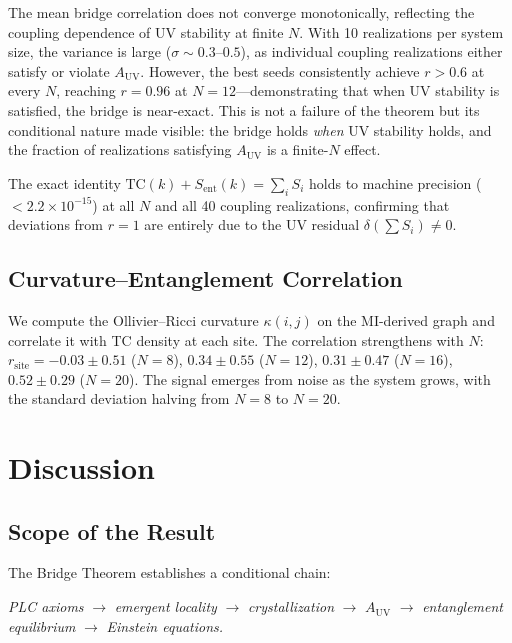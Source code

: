 \documentclass[aps,pra,twocolumn,superscriptaddress,floatfix]{revtex4-2}
\begin{document}
The mean bridge correlation does not converge monotonically, reflecting the coupling dependence of UV stability at finite $N$.
With 10 realizations per system size, the variance is large ($\sigma \sim 0.3$--$0.5$), as individual coupling realizations either satisfy or violate $A_{\mathrm{UV}}$.
However, the best seeds consistently achieve $r > 0.6$ at every $N$, reaching $r = 0.96$ at $N = 12$---demonstrating that when UV stability is satisfied, the bridge is near-exact.
This is not a failure of the theorem but its conditional nature made visible: the bridge holds \emph{when} UV stability holds, and the fraction of realizations satisfying $A_{\mathrm{UV}}$ is a finite-$N$ effect.

The exact identity $\mathrm{TC}(k) + S_{\mathrm{ent}}(k) = \sum_i S_i$ holds to machine precision ($< 2.2 \times 10^{-15}$) at all $N$ and all 40 coupling realizations, confirming that deviations from $r = 1$ are entirely due to the UV residual $\delta(\sum S_i) \neq 0$.

\subsection{Curvature--Entanglement Correlation}

We compute the Ollivier--Ricci curvature $\kappa(i,j)$ on the MI-derived graph and correlate it with TC density at each site.
The correlation strengthens with $N$: $r_{\mathrm{site}} = -0.03 \pm 0.51$ ($N\!=\!8$), $0.34 \pm 0.55$ ($N\!=\!12$), $0.31 \pm 0.47$ ($N\!=\!16$), $0.52 \pm 0.29$ ($N\!=\!20$).
The signal emerges from noise as the system grows, with the standard deviation halving from $N = 8$ to $N = 20$.


\section{Discussion}
\label{sec:discussion}

\subsection{Scope of the Result}

The Bridge Theorem establishes a conditional chain:

\medskip
\noindent
\emph{PLC axioms} $\to$ \emph{emergent locality} $\to$ \emph{crystallization} $\to$ \emph{$A_{\mathrm{UV}}$} $\to$ \emph{entanglement equilibrium} $\to$ \emph{Einstein equations.}
\medskip
\end{document}
